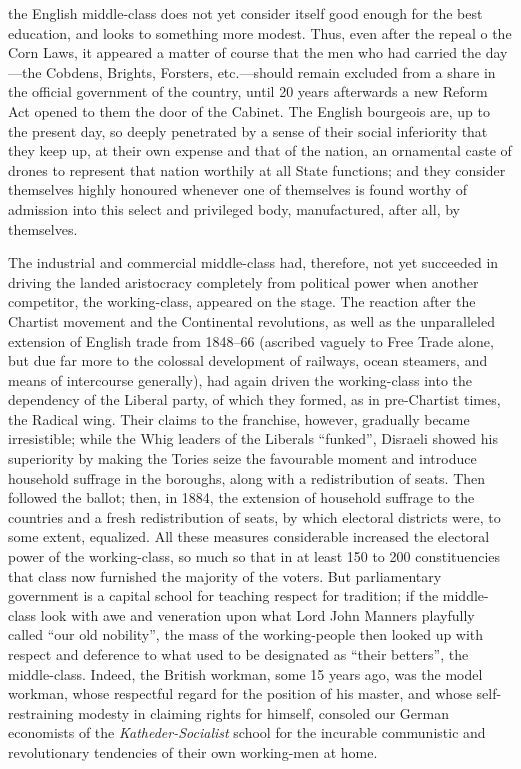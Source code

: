 the English middle-class does not yet consider itself good enough for the best
education, and looks to something more modest. Thus, even after the repeal o
the Corn Laws, it appeared a matter of course that the men who had carried the
day---the Cobdens, Brights, Forsters, etc.---should remain excluded from a share
in the official government of the country, until 20 years afterwards a new
Reform Act opened to them the door of the Cabinet. The English bourgeois are, up
to the present day, so deeply penetrated by a sense of their social inferiority
that they keep up, at their own expense and that of the nation, an ornamental
caste of drones to represent that nation worthily at all State functions; and
they consider themselves highly honoured whenever one of themselves is found
worthy of admission into this select and privileged body, manufactured, after
all, by themselves.

The industrial and commercial middle-class had, therefore, not yet succeeded in
driving the landed aristocracy completely from political power when another
competitor, the working-class, appeared on the stage. The reaction after the
Chartist movement and the Continental revolutions, as well as the unparalleled
extension of English trade from 1848--66 (ascribed vaguely to Free Trade alone,
but due far more to the colossal development of railways, ocean steamers, and
means of intercourse generally), had again driven the working-class into the
dependency of the Liberal party, of which they formed, as in pre-Chartist times,
the Radical wing. Their claims to the franchise, however, gradually became
irresistible; while the Whig leaders of the Liberals ``funked'', Disraeli showed
his superiority by making the Tories seize the favourable moment and introduce
household suffrage in the boroughs, along with a redistribution of seats. Then
followed the ballot; then, in 1884, the extension of household suffrage to the
countries and a fresh redistribution of seats, by which electoral districts
were, to some extent, equalized. All these measures considerable increased the
electoral power of the working-class, so much so that in at least 150 to 200
constituencies that class now furnished the majority of the voters. But
parliamentary government is a capital school for teaching respect for tradition;
if the middle-class look with awe and veneration upon what Lord John Manners
playfully called ``our old nobility'', the mass of the working-people then
looked up with respect and deference to what used to be designated as ``their
betters'', the middle-class. Indeed, the British workman, some 15 years ago, was
the model workman, whose respectful regard for the position of his master, and
whose self-restraining modesty in claiming rights for himself, consoled our
German economists of the \emph{Katheder-Socialist} school for the incurable
communistic and revolutionary tendencies of their own working-men at home.

